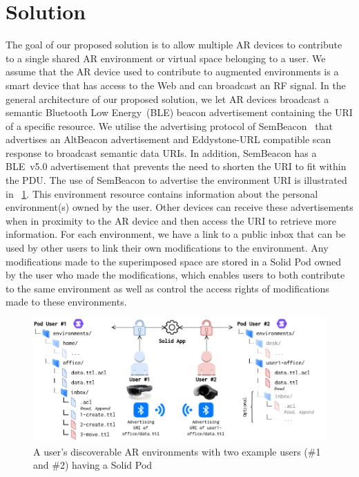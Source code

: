 \section{Solution}
The goal of our proposed solution is to allow multiple AR devices to contribute to a single shared AR environment or virtual space belonging to a user. We assume that the AR device used to contribute to augmented environments is a smart device that has access to the Web and can broadcast an RF signal. In the general architecture of our proposed solution, we let AR devices broadcast a semantic Bluetooth Low Energy~(BLE) beacon advertisement containing the URI of a specific resource. We utilise the advertising protocol of SemBeacon~\cite{10.1145/3627050.3627060} that advertises an AltBeacon advertisement and Eddystone-URL compatible scan response to broadcast semantic data URIs. In addition, SemBeacon has a BLE~v5.0 advertisement that prevents the need to shorten the URI to fit within the PDU. The use of SemBeacon to advertise the environment URI is illustrated in \figurename~\ref{fig:architecture}. This environment resource contains information about the personal environment(s) owned by the user. Other devices can receive these advertisements when in proximity to the AR device and then access the URI to retrieve more information. For each environment, we have a link to a public inbox that can be used by other users to link their own modifications to the environment. Any modifications made to the superimposed space are stored in a Solid Pod owned by the user who made the modifications, which enables users to both contribute to the same environment as well as control the access rights of modifications made to these environments.

\begin{figure}[h]
    \centering
    \includegraphics[scale=0.90]{images/sosy_architecture.pdf}
    \caption{A user's discoverable AR environments with two example users (\#1 and \#2) having a Solid Pod}
    \label{fig:architecture}
\end{figure}

